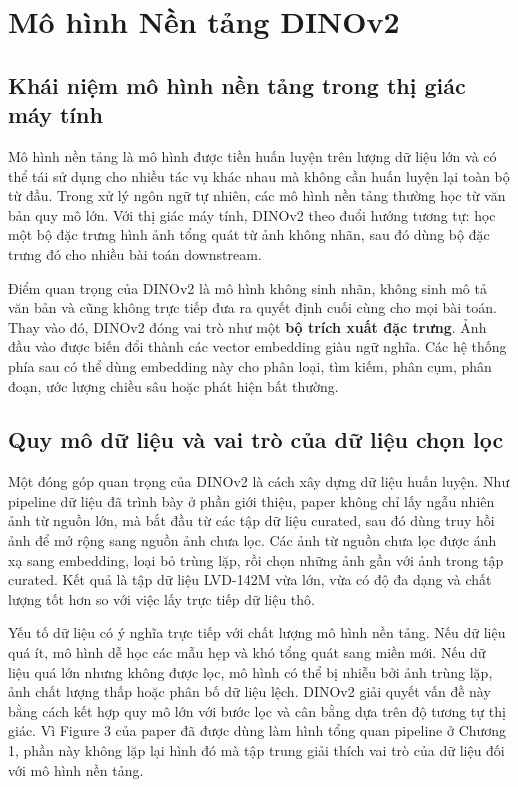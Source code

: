 \section{Mô hình Nền tảng DINOv2}
\subsection{Khái niệm mô hình nền tảng trong thị giác máy tính}
Mô hình nền tảng là mô hình được tiền huấn luyện trên lượng dữ liệu lớn và có thể tái sử dụng cho nhiều tác vụ khác nhau mà không cần huấn luyện lại toàn bộ từ đầu. Trong xử lý ngôn ngữ tự nhiên, các mô hình nền tảng thường học từ văn bản quy mô lớn. Với thị giác máy tính, DINOv2 theo đuổi hướng tương tự: học một bộ đặc trưng hình ảnh tổng quát từ ảnh không nhãn, sau đó dùng bộ đặc trưng đó cho nhiều bài toán downstream.

Điểm quan trọng của DINOv2 là mô hình không sinh nhãn, không sinh mô tả văn bản và cũng không trực tiếp đưa ra quyết định cuối cùng cho mọi bài toán. Thay vào đó, DINOv2 đóng vai trò như một \textbf{bộ trích xuất đặc trưng}. Ảnh đầu vào được biến đổi thành các vector embedding giàu ngữ nghĩa. Các hệ thống phía sau có thể dùng embedding này cho phân loại, tìm kiếm, phân cụm, phân đoạn, ước lượng chiều sâu hoặc phát hiện bất thường.

\subsection{Quy mô dữ liệu và vai trò của dữ liệu chọn lọc}
Một đóng góp quan trọng của DINOv2 là cách xây dựng dữ liệu huấn luyện. Như pipeline dữ liệu đã trình bày ở phần giới thiệu, paper không chỉ lấy ngẫu nhiên ảnh từ nguồn lớn, mà bắt đầu từ các tập dữ liệu curated, sau đó dùng truy hồi ảnh để mở rộng sang nguồn ảnh chưa lọc. Các ảnh từ nguồn chưa lọc được ánh xạ sang embedding, loại bỏ trùng lặp, rồi chọn những ảnh gần với ảnh trong tập curated. Kết quả là tập dữ liệu LVD-142M vừa lớn, vừa có độ đa dạng và chất lượng tốt hơn so với việc lấy trực tiếp dữ liệu thô.

Yếu tố dữ liệu có ý nghĩa trực tiếp với chất lượng mô hình nền tảng. Nếu dữ liệu quá ít, mô hình dễ học các mẫu hẹp và khó tổng quát sang miền mới. Nếu dữ liệu quá lớn nhưng không được lọc, mô hình có thể bị nhiễu bởi ảnh trùng lặp, ảnh chất lượng thấp hoặc phân bố dữ liệu lệch. DINOv2 giải quyết vấn đề này bằng cách kết hợp quy mô lớn với bước lọc và cân bằng dựa trên độ tương tự thị giác. Vì Figure 3 của paper đã được dùng làm hình tổng quan pipeline ở Chương 1, phần này không lặp lại hình đó mà tập trung giải thích vai trò của dữ liệu đối với mô hình nền tảng.

